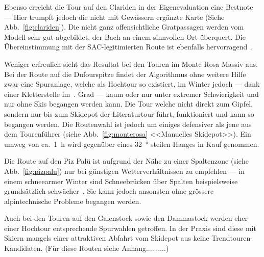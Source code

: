 Ebenso erreicht die Tour auf den Clariden in der Eigenevaluation eine Bestnote --- Hier trumpft jedoch die nicht mit Gewässern ergänzte Karte (Siehe Abb.\ \ref{fig:clariden}). Die nicht ganz offensichtliche Gratpassagen werden vom Modell sehr gut abgebildet, der Bach an einem sinnvollen Ort überquert. Die Übereinstimmung mit der SAC-legitimierten Route ist ebenfalls hervorragend~\cite{twslstgallappzll}.

Weniger erfreulich sieht das Resultat bei den Touren im Monte Rosa Massiv aus. Bei der Route auf die Dufourspitze findet der Algorithmus ohne weitere Hilfe zwar eine Spuranlage, welche als Hochtour so existiert, im Winter jedoch --- dank einer Kletterstelle im~. Grad --- kaum oder nur unter extremer Schwierigkeit und nur ohne Skis begangen werden kann. 
Die Tour welche nicht direkt zum Gipfel, sondern nur bis zum Skidepot der Literaturtour führt, funktioniert und kann so begangen werden. Die Routenwahl ist jedoch um einiges defensiver als jene aus dem Tourenführer (siehe Abb.\ \ref{fig:monterosa} <<Manuelles Skidepot>>). Ein umweg von ca.\ \qty{1}{h} wird gegenüber eines \qty{32}{°} steilen Hanges in Kauf genommen.

Die Route auf den Piz Palü ist aufgrund der Nähe zu einer Spaltenzone (siehe Abb.\ \ref{fig:pizpalu}) nur bei günstigen Wetterverhältnissen zu empfehlen --- in einem schneearmer Winter sind Schneebrücken über Spalten beispielsweise grundsätzlich schwächer~\cite{bergsteigenErhhtesRisiko}. Sie kann jedoch ansonsten ohne grössere alpintechnische Probleme begangen werden.

Auch bei den Touren auf den Galenstock sowie den Dammastock werden eher einer Hochtour entsprechende Spurwahlen getroffen. In der Praxis sind diese mit Skiern mangels einer attraktiven Abfahrt vom Skidepot aus keine Trendtouren-Kandidaten. (Für diese Routen siehe Anhang..........)

